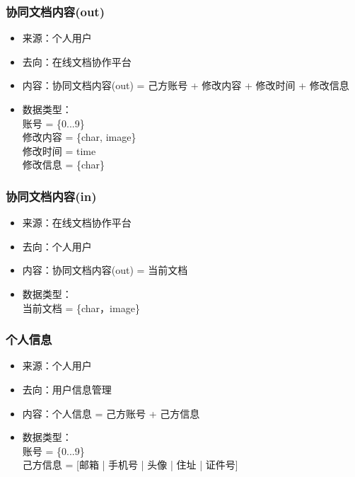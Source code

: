             \subsubsection{协同文档内容(out)}
            \begin{itemize}
                \item 来源：个人用户
                \item 去向：在线文档协作平台
                \item 内容：协同文档内容(out) = 己方账号 + 修改内容 + 修改时间 + 修改信息
                \item 数据类型：\\
                账号 = \{0...9\}\\
                修改内容 = \{char, image\}\\
                修改时间 = time\\
                修改信息 = \{char\}\\
            \end{itemize}
            \subsubsection{协同文档内容(in)}
            \begin{itemize}
                \item 来源：在线文档协作平台
                \item 去向：个人用户
                \item 内容：协同文档内容(out) = 当前文档
                \item 数据类型：\\
                当前文档 = \{char，image\}\\
            \end{itemize}
            \subsubsection{个人信息}
            \begin{itemize}
                \item 来源：个人用户
                \item 去向：用户信息管理
                \item 内容：个人信息 = 己方账号 + 己方信息
                \item 数据类型：\\
                账号 = \{0...9\}\\
                己方信息 = [邮箱 | 手机号 | 头像 | 住址 | 证件号]\\
            \end{itemize}
